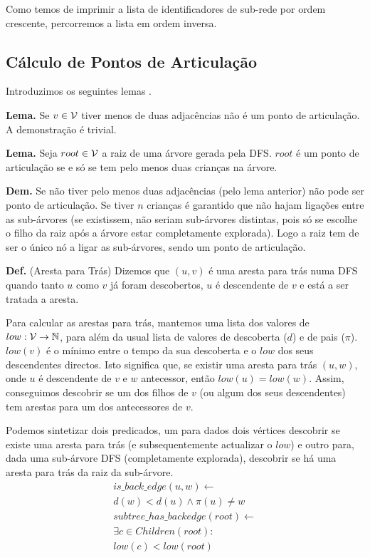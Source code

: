 \documentclass[a4paper, 12pt, conference, portuguese]{ieeeconf}
\begin{document}
Como temos de imprimir a lista de identificadores de sub-rede por ordem crescente,
percorremos a lista em ordem inversa.

\subsection{Cálculo de Pontos de Articulação}\label{art}
Introduzimos os seguintes lemas .

\textbf{Lema.} Se $v \in {\cal V}$ tiver menos de duas adjacências não é um ponto
de articulação. A demonstração é trivial.

\textbf{Lema.} Seja $root \in {\cal V}$ a raiz de uma árvore gerada pela DFS.
$root$ é um ponto de articulação se e só se tem pelo menos duas crianças na árvore.

\textbf{Dem.} Se não tiver pelo menos duas adjacências (pelo lema anterior) não
pode ser ponto de articulação. Se tiver $n$ crianças é
garantido que não hajam ligações entre as sub-árvores (se existissem, não seriam
sub-árvores distintas, pois só se escolhe o filho da raiz após a árvore estar
completamente explorada). Logo a raiz tem de ser o único nó a ligar as
sub-árvores, sendo um ponto de articulação.

\textbf{Def. } (Aresta para Trás) Dizemos que $(u, v)$ é uma aresta para trás
numa DFS quando tanto $u$ como $v$ já foram descobertos, $u$ é descendente de
$v$ e está a ser tratada a aresta.

Para calcular as arestas para trás, mantemos uma lista dos valores de $low:
{\cal V} \to \mathbb{N}$, para além da usual lista de valores de descoberta
($d$) e de pais ($\pi$).
$low(v)$ é o mínimo entre o tempo da sua descoberta e
o $low$ dos seus descendentes directos. Isto significa que, se existir uma aresta
para trás $(u, w)$, onde $u$ é descendente de $v$ e $w$ antecessor, então
$low(u) = low(w)$. Assim, conseguimos descobrir se um dos filhos de $v$ (ou algum dos seus
descendentes) tem arestas para um dos antecessores de $v$.

Podemos sintetizar dois predicados, um para dados dois vértices descobrir se
existe uma aresta para trás (e subsequentemente actualizar o $low$) e outro
para, dada uma sub-árvore DFS (completamente explorada), descobrir se há uma
aresta para trás da raiz da sub-árvore.
\begin{align*}
  is\_back\_edge(u, w) \leftarrow \\ d(w) < d(u) \land \pi(u) \neq w \\
  subtree\_has\_backedge(root) \leftarrow \\ \exists c \in Children(root) : \\
  low(c) < low(root)
\end{align*}
\end{document}
